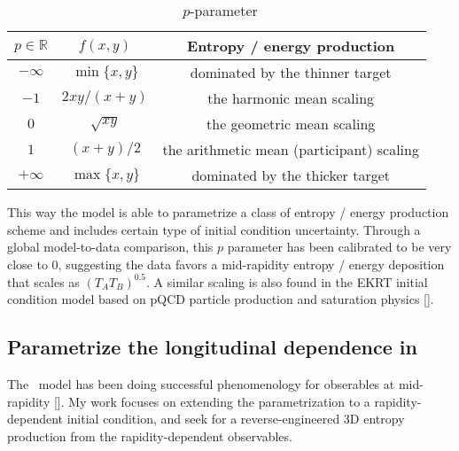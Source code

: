 \begin{table}
\centering
\caption{\trento\ $p$-parameter}\label{tab:trento-p}
\begin{tabular}{ccc}
\hline
$p\in \mathbb{R}$ & $f(x, y)$ & Entropy / energy production\\
\hline
$-\infty$ & $\min\{x, y\}$ &  dominated by the thinner target\\
$-1$ & $2xy/(x+y)$ &   the harmonic mean scaling\\
$0$ & $\sqrt{xy}$ &  the geometric mean scaling\\
$1$ & $(x+y)/2$ &  the arithmetic mean (participant) scaling\\
$+\infty$ & $\max\{x, y\}$ &  dominated by the thicker target \\
\hline
\end{tabular}
\end{table}
This way the model is able to parametrize a class of entropy / energy production scheme and includes certain type of initial condition uncertainty.
Through a global model-to-data comparison, this $p$ parameter has been calibrated to be very close to 0, suggesting the data favors a mid-rapidity entropy / energy deposition that scales as $(T_A T_B)^{0.5}$.
A similar scaling is also found in the EKRT initial condition model based on pQCD particle production and saturation physics [].

\subsection{Parametrize the longitudinal dependence in \trento}
The \trento\ model has been doing successful phenomenology for obserables at mid-rapidity [].
My work focuses on extending the parametrization to a rapidity-dependent initial condition, and seek for a reverse-engineered 3D entropy production from the rapidity-dependent observables.

